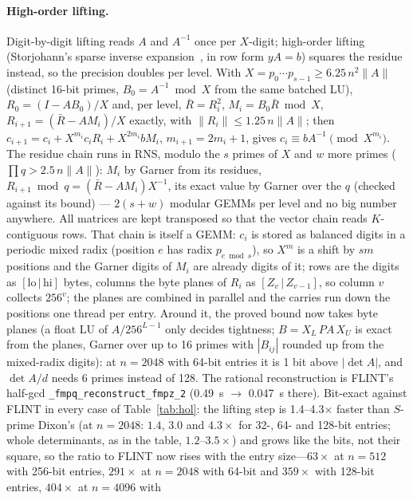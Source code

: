 \documentclass[11pt]{article}
\begin{document}
\paragraph{High-order lifting.} Digit-by-digit lifting reads $A$ and $A^{-1}$ once per $X$-digit; high-order lifting
(Storjohann's sparse inverse expansion~\cite{stor05}, in row form $yA=b$) squares the residue instead, so the precision
doubles per level. With $X=p_0\cdots p_{s-1}\ge 6.25\,n^2\|A\|$ (distinct 16-bit primes, $B_0=A^{-1}\bmod X$ from the same
batched LU), $R_0=(I-AB_0)/X$ and, per level, $\bar R=R_i^2$, $M_i=B_0\bar R \bmod X$, $R_{i+1}=(\bar R-AM_i)/X$ exactly, with
$\|R_i\|\le 1.25\,n\|A\|$; then $c_{i+1}=c_i+X^{m_i}c_iR_i+X^{2m_i}bM_i$, $m_{i+1}=2m_i+1$, gives $c_i\equiv bA^{-1}\pmod{X^{m_i}}$.
The residue chain runs in RNS, modulo the $s$ primes of $X$ and $w$ more primes ($\prod q>2.5\,n\|A\|$): $M_i$ by
Garner from its residues, $R_{i+1}\bmod q=(\bar R-AM_i)X^{-1}$, its exact value by Garner over the $q$ (checked against its
bound) --- $2(s+w)$ modular GEMMs per level and no big number anywhere. All matrices are kept transposed so that the vector
chain reads $K$-contiguous rows. That chain is itself a GEMM: $c_i$ is stored as balanced digits in a periodic mixed radix
(position $e$ has radix $p_{e\bmod s}$), so $X^m$ is a shift by $sm$ positions and the Garner digits of $M_i$ are already
digits of it; rows are the digits as $[\mathrm{lo}\,|\,\mathrm{hi}]$ bytes, columns the byte planes of $R_i$ as
$[Z_v\,|\,Z_{v-1}]$, so column $v$ collects $256^v$; the planes are combined in parallel and the carries run down the
positions one thread per entry. Around it, the proved bound now takes byte planes (a float LU of $A/256^{L-1}$ only decides
tightness; $B=X_L\,PA\,X_U$ is exact from the planes, Garner over up to 16 primes with $|B_{ij}|$ rounded up from the
mixed-radix digits): at $n=2048$ with 64-bit entries it is 1 bit above $|\det A|$, and $\det A/d$ needs 6 primes instead of
128. The rational reconstruction is FLINT's half-gcd \texttt{\_fmpq\_reconstruct\_fmpz\_2} (0.49~s $\to$ 0.047~s there).
Bit-exact against FLINT in every case of Table~\ref{tab:hol}: the lifting step is 1.4--4.3$\times$ faster than $S$-prime
Dixon's (at $n=2048$: $1.4$, $3.0$ and $4.3\times$ for 32-, 64- and 128-bit entries; whole determinants, as in the table,
$1.2$--$3.5\times$) and grows like the bits, not their square, so the ratio to FLINT now rises with the entry size---$63\times$ at $n=512$ with
256-bit entries, $291\times$ at $n=2048$ with 64-bit and $359\times$ with 128-bit entries, $404\times$ at $n=4096$ with
\end{document}
